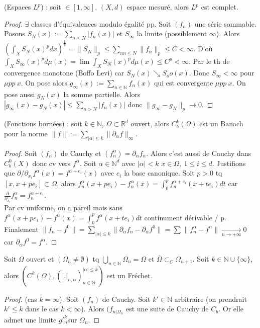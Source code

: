 \begin{ex}
    (Espaces $L^p$) : soit $\in [1,\infty ]$, $(X,d)$ espace mesuré, alors $L^p$ est complet.
\end{ex}
\begin{proof}
    $\exists $ classes d'équivalences modulo égalité pp. Soit $(f_n)$ une série sommable. Posons $S_N(x):=\sum\limits_{n\le N}^{} |f_n(x)|$ et $S_\infty $ la limite (possiblement $\infty $). Alors $\left( \int_XS_N(x)^pdx \right) ^{\frac{1}{p}}=\|S_N\|_p\le \sum\limits_{nn\le N}^{} \|f_n\|_p\le C<\infty$. D'où $\int_XS_\infty (x)^pd\mu(x)=\lim\limits_{} \int_XS_N(x)^pd\mu(x)\le C^p<\infty $. Par le th de convergence monotone (Boffo Levi) car $S_N(x)\searrow S_oo(x)$. Donc $S_\infty <\infty $ pour $\mu pp\ x$. On pose alors $g_\infty (x):=\sum\limits_{n\in \mathbb{N} }^{} f_n(x)$ qui est convergente $\mu pp\ x$. On pose aussi $g_N(x)$ la somme partielle. Alors $|g_\infty(x) -g_N(x)|\le \sum\limits_{n>N}^{} |f_n(x)|$ donc $\|g_\infty -g_N\|_p\to 0$.
\end{proof}

\begin{ex}
    (Fonctions bornées) : soit $k\in \mathbb{N} $, $\Omega\subset \mathbb{R} ^d$ ouvert, alors $C^k_b(\Omega)$ est un Banach pour la norme $\|f\|:=\sum\limits_{|\alpha |\le k}^{} \|\partial_{\alpha }f\|_\infty $.
\end{ex}
\begin{proof}
    Soit $(f_n)$ de Cauchy et $(f_n^\alpha)=\partial_\alpha f_n$. Alors c'est aussi de Cauchy dans $C^0_b(X)$ donc cv vers $f^\alpha $. Soit $\alpha \in \mathbb{N} ^d$ avec $|\alpha |< k$ $x\in \Omega,\ 1\le i\le d$. Justifions que $\partial/\partial_{x_i}f^\alpha (x)=f^{\alpha+e_i}(x) $ avec $e_i$ la base canonique. Soit $p>0$ tq $[x,x+pe_i]\subset \Omega$, alors $f^\alpha _n(x+pe_i)-f^\alpha _n(x)=\int_0^pf_n^{\alpha +e_i}(x+te_i)dt$ car $\frac{\partial}{\partial_{x_i}}f_n^\alpha =f_n^{\alpha +e_i}$.\\
    Par cv uniforme, on a pareil mais sans $f^\alpha(x+pe_i)-f^\alpha(x)=\int_0^pf^{\alpha}(x+te_i)dt$ continument dérivable / p.\\
    Finalement $\|f_n-f^0\|=\sum\limits_{|\alpha |\le k}^{} \|\partial_\alpha f_n-\partial_\alpha f^0\|=\sum\limits_{}^{} \|f_n^\alpha -f^\alpha \| \xrightarrow[n\to +\infty]{} 0$ car $\partial _\alpha f^0=f^\alpha $.
\end{proof}

\begin{ex}
    Soit $\Omega$ ouvert et $(\Omega_n\neq \emptyset )$ tq $\bigcup\limits_{n\in \mathbb{N} } \Omega_n=\Omega$ et $\overline{\Omega}\subset _C\Omega_{n+1}$. Soit $k\in \mathbb{N} \cup \{\infty \} $, alors $\left( C^k(\Omega),(|.|_{n,\alpha })_{n\in \mathbb{N} }^{|\alpha |\le k} \right) $ est un Fréchet.
\end{ex}
\begin{proof}
    (cas $k=\infty $). Soit $(f_n)$ de Cauchy. Soit $k'\in \mathbb{N} $ arbitraire (on prendrait $k'\le k$ dans le cas $k<\infty $). Alors $(f_{n|\Omega_n}$ est une suite de Cauchy de $C_b$. Or elle admet une limite $g'^k_n$sur $\Omega_n$.
\end{proof}
